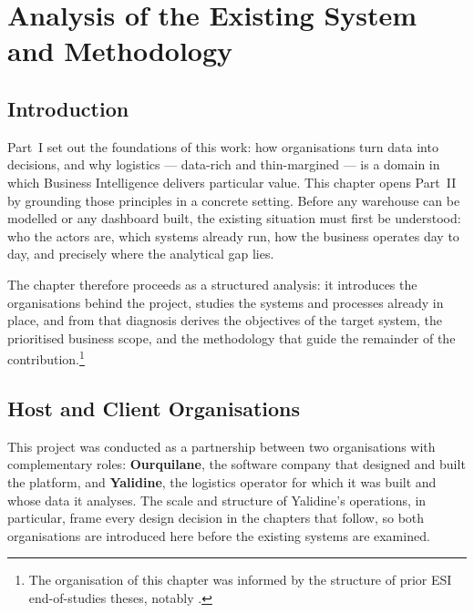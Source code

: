 \chapter{Analysis of the Existing System and Methodology}



\section*{Introduction}

Part~I set out the foundations of this work: how organisations turn data into decisions, and why
logistics --- data-rich and thin-margined --- is a domain in which Business Intelligence delivers
particular value. This chapter opens Part~II by grounding those principles in a concrete setting.
Before any warehouse can be modelled or any dashboard built, the existing situation must first be
understood: who the actors are, which systems already run, how the business operates day to day, and
precisely where the analytical gap lies.

The chapter therefore proceeds as a structured analysis: it introduces the organisations behind the
project, studies the systems and processes already in place, and from that diagnosis derives the
objectives of the target system, the prioritised business scope, and the methodology that guide the
remainder of the contribution.\footnote{The organisation of this chapter was informed by the structure
of prior ESI end-of-studies theses, notably \textcite{soukane2025}.}


\section{Host and Client Organisations}
\label{sec:ch3-orgs}

This project was conducted as a partnership between two organisations with complementary roles:
\textbf{Ourquilane}, the software company that designed and built the platform, and \textbf{Yalidine},
the logistics operator for which it was built and whose data it analyses. The scale and structure of
Yalidine's operations, in particular, frame every design decision in the chapters that follow, so both
organisations are introduced here before the existing systems are examined.


